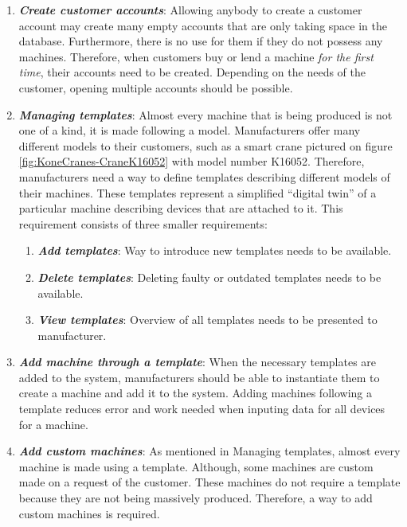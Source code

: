 \begin{enumerate}
	\setlength{\itemsep}{1pt}
	\item \textbf{\textit{Create customer accounts}}: Allowing anybody to create a customer account may create many empty accounts that are only taking space in the database. Furthermore, there is no use for them if they do not possess any machines. Therefore, when customers buy or lend a machine \emph{for the first time}, their accounts need to be created. Depending on the needs of the customer, opening multiple accounts should be possible. 

	\item \textbf{\textit{Managing templates}}: Almost every machine that is being produced is not one of a kind, it is made following a model. Manufacturers offer many different models to their customers, such as a smart crane pictured on figure \ref{fig:KoneCranes-CraneK16052} with model number K16052. Therefore, manufacturers need a way to define templates describing different models of their machines. These templates represent a simplified ``digital twin'' of a particular machine describing devices that are attached to it. This requirement consists of three smaller requirements:

	\begin{enumerate}
		\item \textbf{\textit{Add templates}}: Way to introduce new templates needs to be available.
		\item \textbf{\textit{Delete templates}}: Deleting faulty or outdated templates needs to be available.
		\item \textbf{\textit{View templates}}: Overview of all templates needs to be presented to manufacturer. 
	\end{enumerate}

	\item \textbf{\textit{Add machine through a template}}: When the necessary templates are added to the system, manufacturers should be able to instantiate them to create a machine and add it to the system. Adding machines following a template reduces error and work needed when inputing data for all devices for a machine.

	\item \textbf{\textit{Add custom machines}}: As mentioned in Managing templates, almost every machine is made using a template. Although, some machines are custom made on a request of the customer. These machines do not require a template because they are not being massively produced. Therefore, a way to add custom machines is required.


\end{enumerate}
